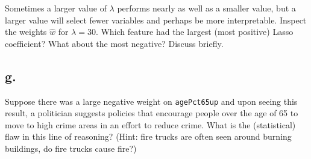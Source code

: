 \documentclass{article}
\newcommand{\1}{\mathbf{1}}
\begin{document}
{Sometimes a larger value of $\lambda$ performs nearly as well as a smaller value, but a larger value will select fewer variables and perhaps be more interpretable.  Inspect the weights $\hat{w}$ for $\lambda = 30$.  Which feature
    had the largest (most positive) Lasso coefficient? What about the most negative? Discuss briefly.

\subsection*{g.}

Suppose there was a large negative weight on
    \texttt{agePct65up} and upon seeing this result, a politician suggests policies that encourage people over the age of 65 to move to high crime areas in an effort to reduce crime. What is the (statistical) flaw in this line of reasoning? (Hint: fire trucks
    are often seen around burning buildings, do fire trucks cause fire?)

}
\end{document}
